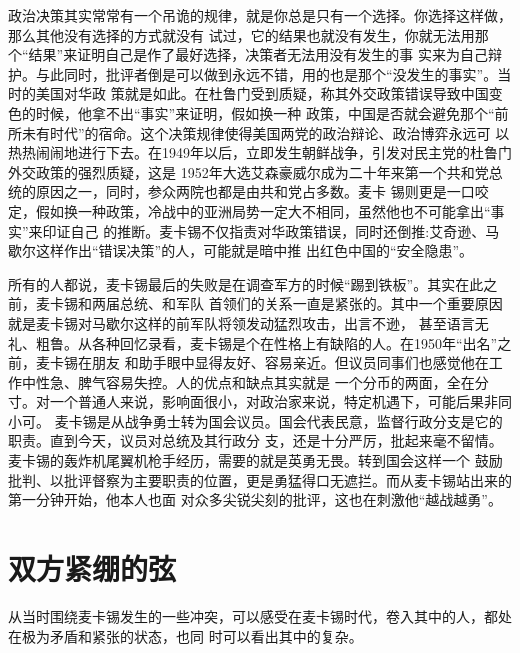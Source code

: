 \documentclass[10pt]{article}
\begin{document}
{政治决策其实常常有一个吊诡的规律，就是你总是只有一个选择。你选择这样做，那么其他没有选择的方式就没有
试过，它的结果也就没有发生，你就无法用那个``结果''来证明自己是作了最好选择，决策者无法用没有发生的事
实来为自己辩护。与此同时，批评者倒是可以做到永远不错，用的也是那个``没发生的事实''。当时的美国对华政
策就是如此。在杜鲁门受到质疑，称其外交政策错误导致中国变色的时候，他拿不出``事实''来证明，假如换一种
政策，中国是否就会避免那个``前所未有时代''的宿命。这个决策规律使得美国两党的政治辩论、政治博弈永远可
以热热闹闹地进行下去。在1949年以后，立即发生朝鲜战争，引发对民主党的杜鲁门外交政策的强烈质疑，这是
1952年大选艾森豪威尔成为二十年来第一个共和党总统的原因之一，同时，参众两院也都是由共和党占多数。麦卡
锡则更是一口咬定，假如换一种政策，冷战中的亚洲局势一定大不相同，虽然他也不可能拿出``事实''来印证自己
的推断。麦卡锡不仅指责对华政策错误，同时还倒推:艾奇逊、马歇尔这样作出``错误决策''的人，可能就是暗中推
出红色中国的``安全隐患''。

所有的人都说，麦卡锡最后的失败是在调查军方的时候``踢到铁板''。其实在此之前，麦卡锡和两届总统、和军队
首领们的关系一直是紧张的。其中一个重要原因就是麦卡锡对马歇尔这样的前军队将领发动猛烈攻击，出言不逊，
甚至语言无礼、粗鲁。从各种回忆录看，麦卡锡是个在性格上有缺陷的人。在1950年``出名''之前，麦卡锡在朋友
和助手眼中显得友好、容易亲近。但议员同事们也感觉他在工作中性急、脾气容易失控。人的优点和缺点其实就是
一个分币的两面，全在分寸。对一个普通人来说，影响面很小，对政治家来说，特定机遇下，可能后果非同小可。
麦卡锡是从战争勇士转为国会议员。国会代表民意，监督行政分支是它的职责。直到今天，议员对总统及其行政分
支，还是十分严厉，批起来毫不留情。麦卡锡的轰炸机尾翼机枪手经历，需要的就是英勇无畏。转到国会这样一个
鼓励批判、以批评督察为主要职责的位置，更是勇猛得口无遮拦。而从麦卡锡站出来的第一分钟开始，他本人也面
对众多尖锐尖刻的批评，这也在刺激他``越战越勇''。

\pagebreak
\section{双方紧绷的弦}

从当时围绕麦卡锡发生的一些冲突，可以感受在麦卡锡时代，卷入其中的人，都处在极为矛盾和紧张的状态，也同
时可以看出其中的复杂。

}
\end{document}
